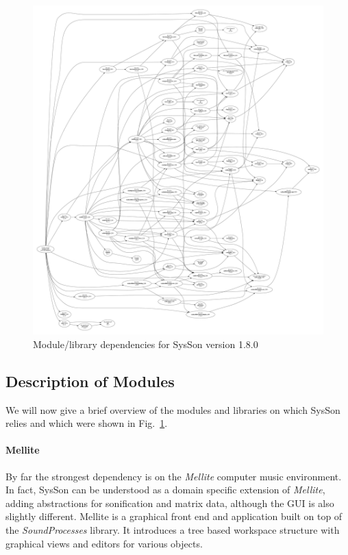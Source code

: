 \documentclass[11pt,a4paper]{article}
\newcommand{\figref}[1]{Fig.~\ref{#1}}
\newcommand{\software}[1]{\textit{#1}}
\newcommand{\sysson}[0]{SysSon}
\newcommand{\syssonVersion}[0]{1.8.0}
\begin{document}
\begin{figure}%
\includegraphics[width=\textwidth,trim=15mm 15mm 15mm 15mm]{figures/dependencies-compile.pdf}%
\caption{Module/library dependencies for SysSon version \syssonVersion{}}%
\label{fig:dependencies}%
\end{figure}

\subsection{Description of Modules}

We will now give a brief overview of the modules and libraries on which \sysson{} relies and which were shown in \figref{fig:dependencies}.

\paragraph{Mellite}

By far the strongest dependency is on the \software{Mellite} computer music environment. In fact, \sysson{} can be understood as a domain specific extension of \software{Mellite}, adding abstractions for sonification and matrix data, although the GUI is also slightly different.
%
Mellite is a graphical front end and application built on top of the \software{SoundProcesses} library. It introduces a tree based workspace structure with graphical views and editors for various objects.
\end{document}
